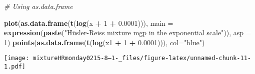 \documentclass[
]{article}
\newenvironment{Shaded}{\begin{snugshade}}{\end{snugshade}}
\newcommand{\AttributeTok}[1]{\textcolor[rgb]{0.13,0.29,0.53}{#1}}
\newcommand{\CommentTok}[1]{\textcolor[rgb]{0.56,0.35,0.01}{\textit{#1}}}
\newcommand{\DecValTok}[1]{\textcolor[rgb]{0.00,0.00,0.81}{#1}}
\newcommand{\FloatTok}[1]{\textcolor[rgb]{0.00,0.00,0.81}{#1}}
\newcommand{\FunctionTok}[1]{\textcolor[rgb]{0.13,0.29,0.53}{\textbf{#1}}}
\newcommand{\NormalTok}[1]{#1}
\newcommand{\SpecialCharTok}[1]{\textcolor[rgb]{0.81,0.36,0.00}{\textbf{#1}}}
\newcommand{\StringTok}[1]{\textcolor[rgb]{0.31,0.60,0.02}{#1}}
\begin{document}
\begin{Shaded}
\begin{Highlighting}[]
\CommentTok{\# Using as.data.frame}

\FunctionTok{plot}\NormalTok{(}\FunctionTok{as.data.frame}\NormalTok{(}\FunctionTok{t}\NormalTok{(}\FunctionTok{log}\NormalTok{(x }\SpecialCharTok{+} \DecValTok{1} \SpecialCharTok{+} \FloatTok{0.0001}\NormalTok{))), }\AttributeTok{main =} \FunctionTok{expression}\NormalTok{(}\FunctionTok{paste}\NormalTok{(}\StringTok{"Hüsler{-}Reiss mixture mgp in the exponential scale"}\NormalTok{)), }\AttributeTok{asp =} \DecValTok{1}\NormalTok{)}
\FunctionTok{points}\NormalTok{(}\FunctionTok{as.data.frame}\NormalTok{(}\FunctionTok{t}\NormalTok{(}\FunctionTok{log}\NormalTok{(x1 }\SpecialCharTok{+} \DecValTok{1} \SpecialCharTok{+} \FloatTok{0.0001}\NormalTok{))), }\AttributeTok{col=}\StringTok{"blue"}\NormalTok{)}
\end{Highlighting}
\end{Shaded}

\texttt{[image: mixtureHRmonday0215-8--1-\_files/figure-latex/unnamed-chunk-11-1.pdf]}
\end{document}
